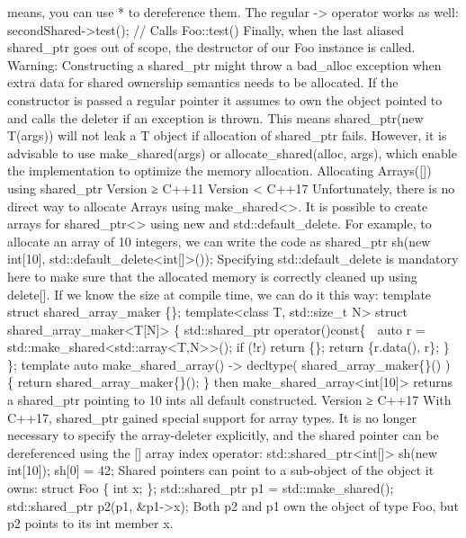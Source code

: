 means, you can use * to dereference them. The regular -\textgreater{}
operator works as well: secondShared-\textgreater test(); // Calls
Foo::test() Finally, when the last aliased shared\_ptr goes out of
scope, the destructor of our Foo instance is called. Warning:
Constructing a shared\_ptr might throw a bad\_alloc exception when extra
data for shared ownership semantics needs to be allocated. If the
constructor is passed a regular pointer it assumes to own the object
pointed to and calls the deleter if an exception is thrown. This means
shared\_ptr(new T(args)) will not leak a T object if allocation of
shared\_ptr fails. However, it is advisable to use make\_shared(args) or
allocate\_shared(alloc, args), which enable the implementation to
optimize the memory allocation. Allocating Arrays({[}{]}) using
shared\_ptr Version ≥ C++11 Version \textless{} C++17 Unfortunately,
there is no direct way to allocate Arrays using
make\_shared\textless\textgreater. It is possible to create arrays for
shared\_ptr\textless\textgreater{} using new and std::default\_delete.
For example, to allocate an array of 10 integers, we can write the code
as shared\_ptr sh(new int{[}10{]},
std::default\_delete\textless int{[}{]}\textgreater()); Specifying
std::default\_delete is mandatory here to make sure that the allocated
memory is correctly cleaned up using delete{[}{]}. If we know the size
at compile time, we can do it this way: template struct
shared\_array\_maker \{\}; template\textless class T, std::size\_t
N\textgreater{} struct
shared\_array\_maker\textless T{[}N{]}\textgreater{} \{ std::shared\_ptr
operator()const\{  auto r =
std::make\_shared\textless std::array\textless T,N\textgreater\textgreater();
if (!r) return \{\}; return \{r.data(), r\}; \} \}; template auto
make\_shared\_array() -\textgreater{} decltype(
shared\_array\_maker\{\}() ) \{ return shared\_array\_maker\{\}(); \}
then make\_shared\_array\textless int{[}10{]}\textgreater{} returns a
shared\_ptr pointing to 10 ints all default constructed. Version ≥ C++17
With C++17, shared\_ptr gained special support for array types. It is no
longer necessary to specify the array-deleter explicitly, and the shared
pointer can be dereferenced using the {[}{]} array index operator:
std::shared\_ptr\textless int{[}{]}\textgreater{} sh(new int{[}10{]});
sh{[}0{]} = 42; Shared pointers can point to a sub-object of the object
it owns: struct Foo \{ int x; \}; std::shared\_ptr p1 =
std::make\_shared(); std::shared\_ptr p2(p1, \&p1-\textgreater x); Both
p2 and p1 own the object of type Foo, but p2 points to its int member x.
